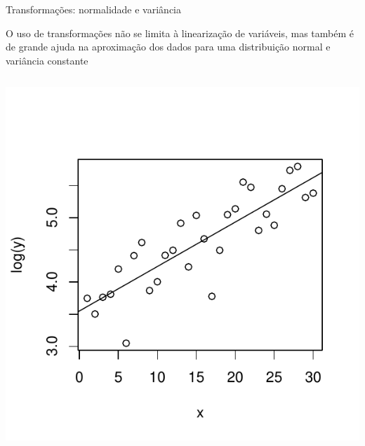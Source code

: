 \documentclass{beamer}\usepackage[]{graphicx}\usepackage[]{color}
\newenvironment{knitrout}{}{} %
\renewenvironment{knitrout}{\setlength{\topsep}{0mm}}{}
\begin{document}
\begin{frame}{Transformações: normalidade e variância}

 O uso de transformações não se limita à linearização de variáveis, mas também é de grande ajuda na aproximação dos dados para uma distribuição normal e variância constante
\begin{columns}[c]


\begin{knitrout}\scriptsize
{}\color{fgcolor}
\includegraphics[width=0.9\linewidth]{figure/t3-1} 

\end{knitrout}


\centering


\end{columns}
\end{frame}
\end{document}
